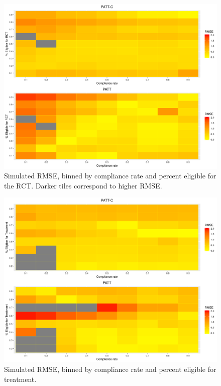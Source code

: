 \documentclass[hidelinks,12pt]{article}
\begin{document}
{\begin{figure}[htbp]
\begin{center}
\includegraphics[width = 1\textwidth]{rmse_ratec_rates}
\caption{Simulated RMSE, binned by compliance rate and percent eligible for the RCT. Darker tiles correspond to higher RMSE.\label{fig:rmse_ratec_rates}}
\end{center}
\end{figure}

\begin{figure}[htbp]
	\begin{center}
		\includegraphics[width = 1\textwidth]{rmse_ratec_ratet}
		\caption{Simulated RMSE, binned by compliance rate and percent eligible for treatment. \label{fig:rmse_ratec_ratet}}
	\end{center}
\end{figure}

}
\end{document}
